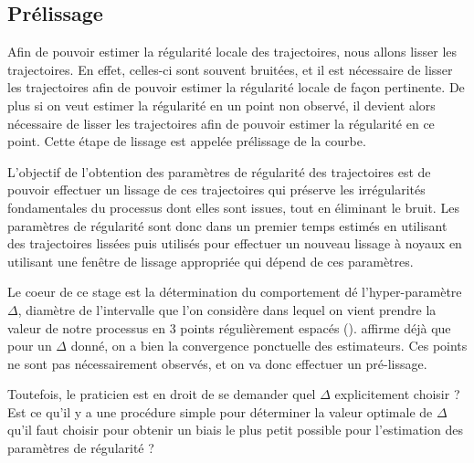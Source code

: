 

\subsection{Prélissage}


Afin de pouvoir estimer la régularité locale des trajectoires, nous allons lisser les trajectoires. En effet, celles-ci sont souvent bruitées, et il est nécessaire de lisser les trajectoires afin de pouvoir estimer la régularité locale de façon pertinente. De plus si on veut estimer la régularité en un point non observé, il devient alors nécessaire de lisser les trajectoires afin de pouvoir estimer la régularité en ce point. Cette étape de lissage est appelée prélissage de la courbe.


L'objectif de l'obtention des paramètres de régularité des trajectoires est de pouvoir effectuer un lissage de ces trajectoires qui préserve les irrégularités fondamentales du processus dont elles sont issues, tout en éliminant le bruit. Les paramètres de régularité sont donc dans un premier temps estimés en utilisant des trajectoires lissées puis utilisés pour effectuer un nouveau lissage à noyaux en utilisant une fenêtre de lissage appropriée qui dépend de ces paramètres. 

\bigskip

Le coeur de ce stage est la détermination du comportement dé l'hyper-paramètre $\Delta$, diamètre de l'intervalle que l'on considère dans lequel on vient prendre la valeur de notre processus en 3 points régulièrement espacés (). \cite{maissoro-SmoothnessFTSweakDep} affirme déjà que pour un $\Delta$ donné, on a bien la convergence ponctuelle des estimateurs. Ces points ne sont pas nécessairement observés, et on va donc effectuer un pré-lissage. 

\smallskip

Toutefois, le praticien est en droit de se demander quel $\Delta$ explicitement choisir ? Est ce qu'il y a une procédure simple pour déterminer la valeur optimale de $\Delta$ qu'il faut choisir pour obtenir un biais le plus petit possible pour l'estimation des paramètres de régularité ?

